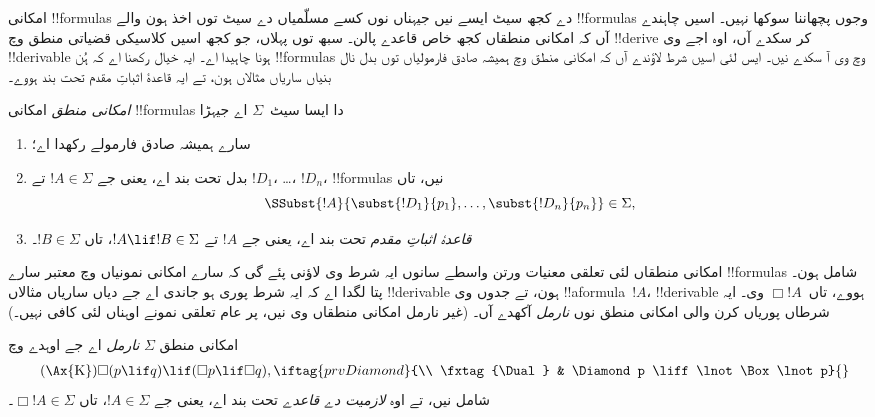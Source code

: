 \documentclass[../../../include/open-logic-section]{subfiles}
\begin{document}


امکانی !!{formula}s دے کجھ سیٹ ایسے نیں جیہناں نوں کسے مسلّمیاں دے سیٹ توں اخذ ہون والے !!{formula}s وجوں پچھاننا سوکھا نہیں۔ اسیں چاہندے آں کہ امکانی منطقاں کجھ خاص قاعدے پالن۔ سبھ توں پہلاں، جو کجھ اسیں کلاسیکی قضیاتی منطق وچ !!{derive} کر سکدے آں، اوہ اجے وی !!{derivable} ہونا چاہیدا اے۔ ایہ خیال رکھنا اے کہ ہُن !!{formula}s وچ
 وی آ سکدے نیں۔ ایس لئی اسیں شرط لاؤندے آں کہ امکانی منطق وچ ہمیشہ صادق فارمولیاں توں بدل نال بنیاں ساریاں مثالاں ہون، تے ایہ قاعدۂ اثباتِ مقدم تحت بند ہووے۔

\begin{defn}
  \emph{امکانی منطق} امکانی !!{formula}s دا ایسا سیٹ~$\Sigma$ اے جیہڑا
  \begin{enumerate}
  \item سارے ہمیشہ صادق فارمولے رکھدا اے؛
  \item بدل تحت بند اے، یعنی جے $!A \in \Sigma$ تے
    $!D_1$، \dots، $!D_n$، !!{formula}s نیں، تاں
    \[
    \SSubst{!A}{\subst{!D_1}{p_1}, \dots, \subst{!D_n}{p_n}} \in \Sigma,
    \]
  \item \emph{قاعدۂ اثباتِ مقدم} تحت بند اے، یعنی جے $!A$ تے $!A
      \lif !B \in \Sigma$، تاں $!B \in \Sigma$۔
  \end{enumerate}
\end{defn}

امکانی منطقاں لئی تعلقی معنیات ورتن واسطے سانوں ایہ شرط وی لاؤنی پئے گی کہ سارے امکانی نمونیاں وچ معتبر سارے !!{formula}s شامل ہون۔ پتا لگدا اے کہ ایہ شرط پوری ہو جاندی اے جے  دیاں ساریاں مثالاں
!!{derivable} ہون، تے جدوں وی !!a{formula}~$!A$، !!{derivable} ہووے، تاں~$\Box !A$ وی۔ ایہ شرطاں پوریاں کرن والی امکانی منطق نوں \emph{نارمل} آکھدے آں۔ (غیر نارمل امکانی منطقاں وی نیں، پر عام تعلقی نمونے اوہناں لئی کافی نہیں۔)

\begin{defn}
  امکانی منطق $\Sigma$ \emph{نارمل} اے جے اوہدے وچ
  \begin{align*}
    \tag{\Ax{K}} & \Box(p \lif q) \lif (\Box p \lif \Box q),
    \iftag{prvDiamond}{\\
      \tag{\Dual} & \Diamond p \liff \lnot\Box\lnot p}{}
  \end{align*}
  شامل نیں، تے اوہ \emph{لازمیت دے قاعدے} تحت بند اے، یعنی جے $!A \in
  \Sigma$، تاں $\Box !A \in \Sigma$۔
\end{defn}
\end{document}
